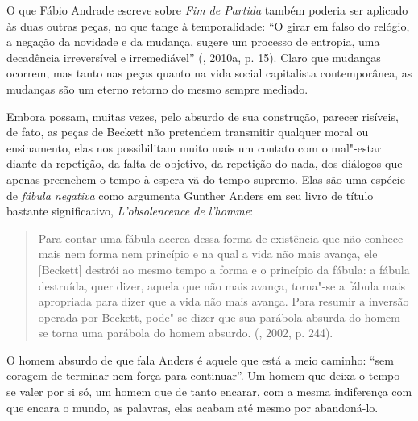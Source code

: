 {O que Fábio Andrade escreve sobre \emph{Fim de Partida} também poderia
ser aplicado às duas outras peças, no que tange à temporalidade: ``O
girar em falso do relógio, a negação da novidade e da mudança, sugere um
processo de entropia, uma decadência irreversível e irremediável''
(, 2010a, p. 15). Claro que mudanças ocorrem, mas tanto nas peças
quanto na vida social capitalista contemporânea, as mudanças são um
eterno retorno do mesmo sempre mediado.

Embora possam, muitas vezes, pelo absurdo de sua construção, parecer
risíveis, de fato, as peças de Beckett não pretendem transmitir qualquer
moral ou ensinamento, elas nos possibilitam muito mais um contato com o
mal"-estar diante da repetição, da falta de objetivo, da repetição do
nada, dos diálogos que apenas preenchem o tempo à espera vã do tempo
supremo. Elas são uma espécie de \emph{fábula negativa} como argumenta
Gunther Anders em seu livro de título bastante significativo,
\emph{L'obsolencence de l'homme}:

\begin{quote}
Para contar uma fábula acerca dessa forma de existência que não conhece
mais nem forma nem princípio e na qual a vida não mais avança, ele
[Beckett] destrói ao mesmo tempo a forma e o princípio da fábula: a
fábula destruída, quer dizer, aquela que não mais avança, torna"-se a
fábula mais apropriada para dizer que a vida não mais avança. Para
resumir a inversão operada por Beckett, pode"-se dizer que sua parábola
absurda do homem se torna uma parábola do homem absurdo. (, 2002,
p. 244).
\end{quote}

O homem absurdo de que fala Anders é aquele que está a meio caminho:
``sem coragem de terminar nem força para continuar''. Um homem que deixa
o tempo se valer por si só, um homem que de tanto encarar, com a mesma
indiferença com que encara o mundo, as palavras, elas acabam até mesmo
por abandoná-lo.

}
